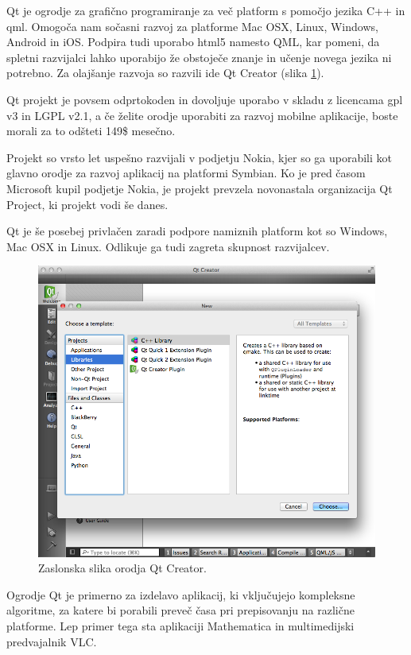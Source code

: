 Qt\cite{qt} je ogrodje za grafično programiranje za več platform s pomočjo jezika C++ in \gls{qml}. Omogoča nam sočasni razvoj za platforme Mac OSX, Linux, Windows, Android in iOS. Podpira tudi uporabo \gls{html5} namesto QML, kar pomeni, da spletni razvijalci lahko uporabijo že obstoječe znanje in učenje novega jezika ni potrebno. Za olajšanje razvoja so razvili \gls{ide} Qt Creator (slika \ref{fig:qt-creator}).

Qt projekt je povsem odprtokoden in dovoljuje uporabo v skladu z licencama \gls{gpl} v3\cite{gpl} in LGPL v2.1\cite{lgpl}, a če želite orodje uporabiti za razvoj mobilne aplikacije, boste morali za to odšteti 149\$ mesečno.

Projekt so vrsto let uspešno razvijali v podjetju Nokia, kjer so ga uporabili kot glavno orodje za razvoj aplikacij na platformi Symbian. Ko je pred časom Microsoft kupil podjetje Nokia, je projekt prevzela novonastala organizacija Qt Project, ki projekt vodi še danes.

Qt je še posebej privlačen zaradi podpore namiznih platform kot so Windows, Mac OSX in Linux. Odlikuje ga tudi zagreta skupnost razvijalcev.

\begin{figure}
 \includegraphics[width=\linewidth]{qt-creator}
 \caption{Zaslonska slika orodja Qt Creator.}
 \label{fig:qt-creator}
\end{figure}

Ogrodje Qt je primerno za izdelavo aplikacij, ki vključujejo kompleksne algoritme, za katere bi porabili preveč časa pri prepisovanju na različne platforme. Lep primer tega sta aplikaciji Mathematica\cite{mathematica} in multimedijski predvajalnik VLC\cite{vlc}.

